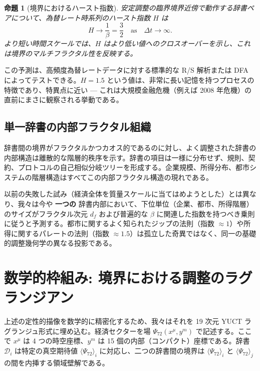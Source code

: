 \documentclass[12pt,a4paper]{article}
\newtheorem{proposition}[theorem]{命題}
\theoremstyle{remark}
\begin{document}
	\begin{proposition}[境界におけるハースト指数]
		安定調整の臨界境界近傍で動作する辞書ペアについて、為替レート時系列のハースト指数 \(H\) は
		\begin{equation}
			H \to \frac{1}{\beta} = \frac{3}{2} \quad \text{as} \quad \Delta t \to \infty.
			\label{eq:hurst}
		\end{equation}
		より短い時間スケールでは、\(H\) はより低い値へのクロスオーバーを示し、これは境界のマルチフラクタル性を反映する。
	\end{proposition}
	
	この予測は、高頻度為替レートデータに対する標準的な R/S 解析または DFA によってテストできる。\(H = 1.5\) という値は、非常に長い記憶を持つプロセスの特徴であり、特異点に近い — これは大規模金融危機（例えば 2008 年危機）の直前にまさに観察される挙動である。
	
	\subsection{単一辞書の内部フラクタル組織}
	
	辞書間の境界がフラクタルかつカオス的であるのに対し、よく調整された辞書の内部構造は離散的な階層的秩序を示す。辞書の項目は一様に分布せず、規則、契約、プロトコルの自己相似分岐ツリーを形成する。企業規模、所得分布、都市システムの階層構造はすべてこの内部フラクタル構造の現れである。
	
	以前の失敗した試み（経済全体を質量スケールに当てはめようとした）とは異なり、我々は今や \textbf{一つの} 辞書内部において、下位単位（企業、都市、所得階層）のサイズがフラクタル次元 \(d_f\) および普遍的な \(\beta\) に関連した指数を持つべき乗則に従うと予測する。都市に関するよく知られたジップの法則（指数 \(\approx 1\)）や所得に関するパレートの法則（指数 \(\approx 1.5\)）は孤立した奇異ではなく、同一の基礎的調整幾何学の異なる投影である。
	
	\section{数学的枠組み: 境界における調整のラグランジアン}
	
	上述の定性的描像を数学的に精密化するため、我々はそれを 19 次元 YUCT ラグランジュ形式に埋め込む。経済セクターを場 \(\Psi_{72}(x^\mu, y^m)\) で記述する。ここで \(x^\mu\) は 4 つの時空座標、\(y^m\) は 15 個の内部（コンパクト）座標である。辞書 \(\mathcal{D}_i\) は特定の真空期待値 \(\langle \Psi_{72} \rangle_i\) に対応し、二つの辞書間の境界は \(\langle \Psi_{72} \rangle_i\) と \(\langle \Psi_{72} \rangle_j\) の間を内挿する領域壁解である。
	
\end{document}
